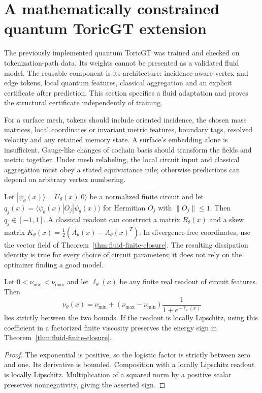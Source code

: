 


\section{A mathematically constrained quantum ToricGT extension}

The previously implemented quantum ToricGT was trained and checked on tokenization-path data. Its weights cannot be presented as a validated fluid model. The reusable component is its architecture: incidence-aware vertex and edge tokens, local quantum features, classical aggregation and an explicit certificate after prediction. This section specifies a fluid adaptation and proves the structural certificate independently of training.

For a surface mesh, tokens should include oriented incidence, the chosen mass matrices, local coordinates or invariant metric features, boundary tags, resolved velocity and any retained memory state. A surface's embedding alone is insufficient. Gauge-like changes of cochain basis should transform the fields and metric together. Under mesh relabeling, the local circuit input and classical aggregation must obey a stated equivariance rule; otherwise predictions can depend on arbitrary vertex numbering.

Let $|\psi_\theta(x)\rangle=U_\theta(x)|0\rangle$ be a normalized finite circuit and let
$q_j(x)=\langle\psi_\theta(x)|O_j|\psi_\theta(x)\rangle$ for Hermitian $O_j$ with $\|O_j\|\le1$. Then $q_j\in[-1,1]$. A classical readout can construct a matrix $B_\theta(x)$ and a skew matrix $K_\theta(x)=\tfrac12(A_\theta(x)-A_\theta(x)^T)$. In divergence-free coordinates, use the vector field of Theorem~\ref{thm:fluid-finite-closure}. The resulting dissipation identity is true for every choice of circuit parameters; it does not rely on the optimizer finding a good model.

\begin{proposition}
\label{prop:fluid-positive-readout}
Let $0<\nu_{\min}<\nu_{\max}$ and let $\ell_\theta(x)$ be any finite real readout of circuit features. Then
\[
 \nu_\theta(x)=\nu_{\min}+
 (\nu_{\max}-\nu_{\min})\frac1{1+e^{-\ell_\theta(x)}}
\]
lies strictly between the two bounds. If the readout is locally Lipschitz, using this coefficient in a factorized finite viscosity preserves the energy sign in Theorem~\ref{thm:fluid-finite-closure}.
\end{proposition}
\begin{proof}
The exponential is positive, so the logistic factor is strictly between zero and one. Its derivative is bounded. Composition with a locally Lipschitz readout is locally Lipschitz. Multiplication of a squared norm by a positive scalar preserves nonnegativity, giving the asserted sign.
\end{proof}

